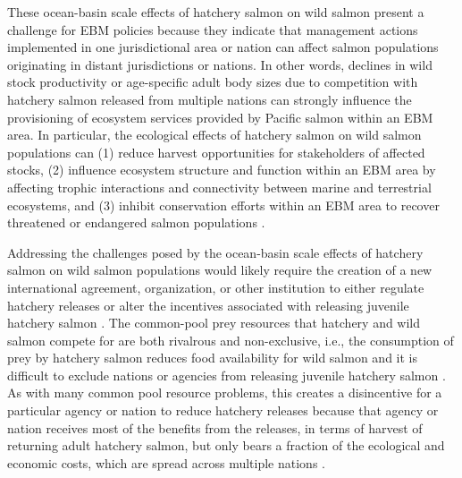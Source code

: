 These ocean-basin scale effects of hatchery salmon on wild salmon
present a challenge for EBM policies because they indicate that
management actions implemented in one jurisdictional area or nation can
affect salmon populations originating in distant jurisdictions or
nations. In other words, declines in wild stock productivity or
age-specific adult body sizes due to competition with hatchery salmon
released from multiple nations can strongly influence the provisioning
of ecosystem services provided by Pacific salmon within an EBM area. In
particular, the ecological effects of hatchery salmon on wild salmon
populations can (1) reduce harvest opportunities for stakeholders of
affected stocks, (2) influence ecosystem structure and function within
an EBM area by affecting trophic interactions and connectivity between
marine and terrestrial ecosystems, and (3) inhibit conservation efforts
within an EBM area to recover threatened or endangered salmon
populations \citep{Ruggerone2003a, Nielsen2009a}.

Addressing the challenges posed by the ocean-basin scale effects of
hatchery salmon on wild salmon populations would likely require the
creation of a new international agreement, organization, or other
institution to either regulate hatchery releases or alter the incentives
associated with releasing juvenile hatchery salmon \citep{Holt2008b}.
The common-pool prey resources that hatchery and wild salmon compete for
are both rivalrous and non-exclusive, i.e., the consumption of prey by
hatchery salmon reduces food availability for wild salmon and it is
difficult to exclude nations or agencies from releasing juvenile
hatchery salmon \citep{Hardin1968a}. As with many common pool resource
problems, this creates a disincentive for a particular agency or nation
to reduce hatchery releases because that agency or nation receives most
of the benefits from the releases, in terms of harvest of returning
adult hatchery salmon, but only bears a fraction of the ecological and
economic costs, which are spread across multiple nations
\citep{Holt2008b}.

